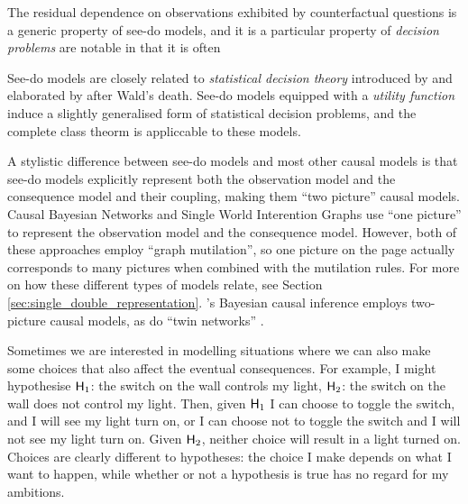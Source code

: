 

The residual dependence on observations exhibited by counterfactual questions is a generic property of see-do models, and it is a particular property of \emph{decision problems} are notable in that it is often


See-do models are closely related to \emph{statistical decision theory} introduced by \citet{wald_statistical_1950} and elaborated by \citet{savage_foundations_1972} after Wald's death. See-do models equipped with a \emph{utility function} induce a slightly generalised form of statistical decision problems, and the complete class theorm is appliccable to these models.

A stylistic difference between see-do models and most other causal models is that see-do models explicitly represent both the observation model and the consequence model and their coupling, making them ``two picture'' causal models. Causal Bayesian Networks and Single World Interention Graphs \citep{richardson2013single} use ``one picture'' to represent the observation model and the consequence model. However, both of these approaches employ ``graph mutilation'', so one picture on the page actually corresponds to many pictures when combined with the mutilation rules. For more on how these different types of models relate, see Section \ref{sec:single_double_representation}. \citet{lattimore_replacing_2019}'s Bayesian causal inference employs two-picture causal models, as do ``twin networks'' \citep{pearl_causality:_2009}.

Sometimes we are interested in modelling situations where we can also make some choices that also affect the eventual consequences. For example, I might hypothesise $\mathsf{H}_1$: the switch on the wall controls my light, $\mathsf{H}_2$: the switch on the wall does not control my light. Then, given $\mathsf{H}_1$ I can choose to toggle the switch, and I will see my light turn on, or I can choose not to toggle the switch and I will not see my light turn on. Given $\mathsf{H}_2$, neither choice will result in a light turned on. Choices are clearly different to hypotheses: the choice I make depends on what I want to happen, while whether or not a hypothesis is true has no regard for my ambitions.

